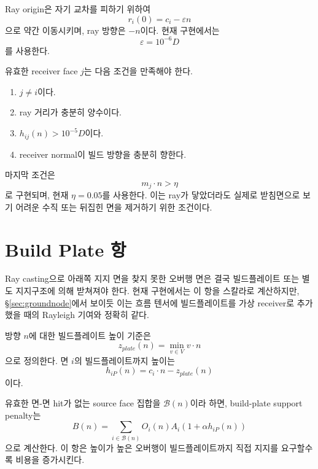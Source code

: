 \documentclass[11pt,a4paper]{article}
\begin{document}
Ray origin은 자기 교차를 피하기 위하여
\begin{equation}
r_i(0)=c_i-\varepsilon n
\end{equation}
으로 약간 이동시키며, ray 방향은 $-n$이다.
현재 구현에서는
\begin{equation}
\varepsilon = 10^{-6}D
\end{equation}
를 사용한다.

유효한 receiver face $j$는 다음 조건을 만족해야 한다.

\begin{enumerate}
\item $j\ne i$이다.
\item ray 거리가 충분히 양수이다.
\item $h_{ij}(n)>10^{-5}D$이다.
\item receiver normal이 빌드 방향을 충분히 향한다.
\end{enumerate}

마지막 조건은
\begin{equation}
m_j\cdot n > \eta
\end{equation}
로 구현되며, 현재 $\eta=0.05$를 사용한다.
이는 ray가 닿았더라도 실제로 받침면으로 보기 어려운 수직 또는 뒤집힌 면을 제거하기 위한 조건이다.

\section{Build Plate 항}

Ray casting으로 아래쪽 지지 면을 찾지 못한 오버행 면은 결국 빌드플레이트 또는 별도 지지구조에 의해 받쳐져야 한다.
현재 구현에서는 이 항을 스칼라로 계산하지만,
\S\ref{sec:groundnode}에서 보이듯 이는 흐름 텐서에 빌드플레이트를 가상 receiver로 추가했을 때의 Rayleigh 기여와 정확히 같다.

방향 $n$에 대한 빌드플레이트 높이 기준은
\begin{equation}
z_{plate}(n)=\min_{v\in V} v\cdot n
\end{equation}
으로 정의한다.
면 $i$의 빌드플레이트까지 높이는
\begin{equation}
h_{iP}(n)=c_i\cdot n-z_{plate}(n)
\end{equation}
이다.

유효한 면-면 hit가 없는 source face 집합을 $\mathcal{B}(n)$이라 하면,
build-plate support penalty는
\begin{equation}
B(n)
=
\sum_{i\in\mathcal{B}(n)}
O_i(n)A_i\left(1+\alpha h_{iP}(n)\right)
\end{equation}
으로 계산한다.
이 항은 높이가 높은 오버행이 빌드플레이트까지 직접 지지를 요구할수록 비용을 증가시킨다.
\end{document}
